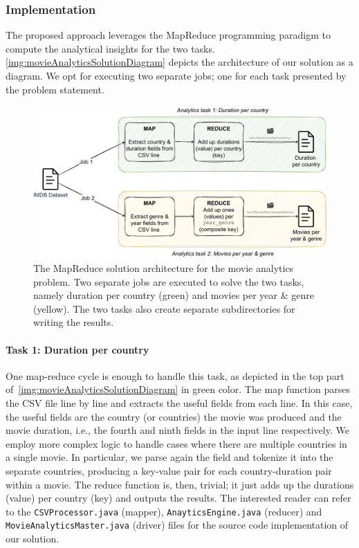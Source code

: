 \documentclass[acmlarge]{acmart}
\begin{document}
\subsubsection{Implementation}
The proposed approach leverages the MapReduce programming paradigm to compute the analytical insights for the two tasks. \autoref{img:movieAnalyticsSolutionDiagram} depicts the architecture of our solution as a diagram. We opt for executing two separate jobs; one for each task presented by the problem statement.

\begin{figure}[tb!]
  \centering
  \includegraphics[width=0.8\linewidth]{figures/movieAnalytics}
  \caption{The MapReduce solution architecture for the movie analytics problem. Two separate jobs are executed to solve the two tasks, namely duration per country (green) and movies per year \& genre (yellow). The two tasks also create separate subdirectories for writing the results.}
  \label{img:movieAnalyticsSolutionDiagram}
\end{figure}

\paragraph{Task 1: Duration per country} One map-reduce cycle is enough to handle this task, as depicted in the top part of~\autoref{img:movieAnalyticsSolutionDiagram} in green color. The map function parses the CSV file line by line and extracts the useful fields from each line. In this case, the useful fields are the country (or countries) the movie was produced and the movie duration, i.e., the fourth and ninth fields in the input line respectively. We employ more complex logic to handle cases where there are multiple countries in a single movie. In particular, we parse again the field and tokenize it into the separate countries, producing a key-value pair for each country-duration pair within a movie. The reduce function is, then, trivial; it just adds up the durations (value) per country (key) and outputs the results. The interested reader can refer to the \texttt{CSVProcessor.java} (mapper), \texttt{AnayticsEngine.java} (reducer) and \texttt{MovieAnalyticsMaster.java} (driver) files for the source code implementation of our solution.
\end{document}
